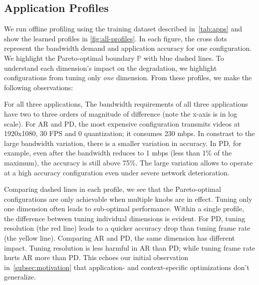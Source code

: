 \subsection{Application Profiles}
\label{sec:application-profiles}

We run offline profiling using the training dataset described
in~\autoref{tab:apps} and show the learned profiles in
\autoref{fig:all-profiles}. In each figure, the cross dots represent the
bandwidth demand and application accuracy for one configuration. We highlight
the Pareto-optimal boundary $\mathbb{P}$ with blue dashed lines. To understand
each dimension's impact on the degradation, we highlight configurations from
tuning only \textit{one} dimension. From these profiles, we make the following
observations:

 For all three applications, The bandwidth
requirements of all three applications have two to three orders of magnitude of
difference (note the x-axis is in log scale). For AR and PD, the most expensive
configuration transmits videos at 1920x1080, 30 FPS and 0 quantization; it
consumes 230 mbps. In constrast to the large bandwidth variation, there is a
smaller variation in accuracy. In PD, for example, even after the bandwidth
reduces to 1 mbps (less than 1\% of the maximum), the accuracy is still above
75\%. The large variation allows \sysname{} to operate at a high accuracy
configuration even under severe network deterioration.

 Comparing dashed lines in each
profile, we see that the Pareto-optimal configurations are only achievable when
multiple knobs are in effect. Tuning only one dimension often leads to
sub-optimal performance. Within a single profile, the difference between tuning
individual dimensions is evident. For PD, tuning resolution (the red line) leads
to a quicker accuracy drop than tuning frame rate (the yellow line). Comparing
AR and PD, the same dimension has different impact. Tuning resolution is less
harmful in AR than PD; while tuning frame rate hurts AR more than PD\@. This
echoes our initial observation in~\autoref{subsec:motivation} that application-
and context-specific optimizations don't generalize.


